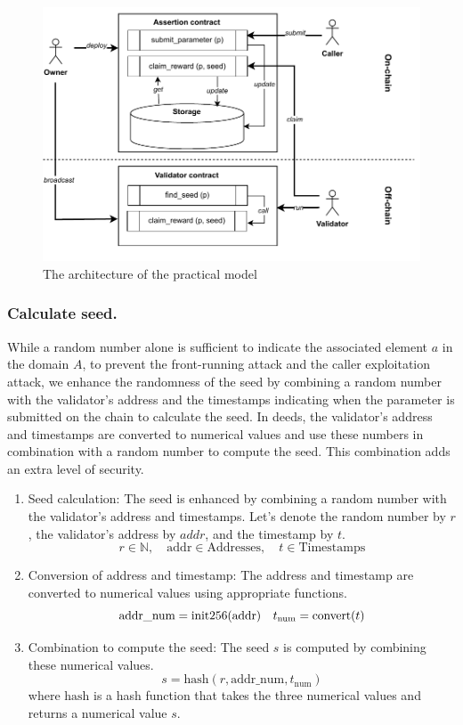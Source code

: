 \documentclass[runningheads]{llncs}
\begin{document}
\begin{figure}
\centering
\includegraphics[scale=.8]{assertion}
\caption{The architecture of the practical model}
\label{fig.architect}
\end{figure}
\subsubsection{Calculate seed.}
While a random number alone is sufficient to indicate the associated element $a$ in the domain $A$, to prevent the front-running attack and the caller exploitation attack, we enhance the randomness of the seed by combining a random number with the validator's address and the timestamps indicating when the parameter is submitted on the chain to calculate the seed. In deeds, the validator's address and timestamps are converted to numerical values and use these numbers in combination with a random number to compute the seed. This combination adds an extra level of security. 
\begin{enumerate}
\item 
Seed calculation: The seed is enhanced by combining a random number with the validator's address and timestamps. Let's denote the random number by $r$, the validator's address by $addr$, and the timestamp by $t$.
\begin{equation}
r \in \mathbb{N}, \quad \text{addr} \in \text{Addresses}, \quad t \in \text{Timestamps}
\end{equation}
\item Conversion of address and timestamp: The address and timestamp are converted to numerical values using appropriate functions.
\begin{equation}
\text{addr\_num} = \text{init256}(\text{addr}) \\
 \quad t_{\text{num}} = \text{convert}(t)
\end{equation}
\item Combination to compute the seed: The seed $s$ is computed by combining these numerical values.
\begin{equation}
s = \text{hash}(r, \text{addr\_num}, t_{\text{num}})
\end{equation}
where \(\text{hash}\) is a hash function that takes the three numerical values and returns a numerical value \( s \).
\end{enumerate}
\end{document}
